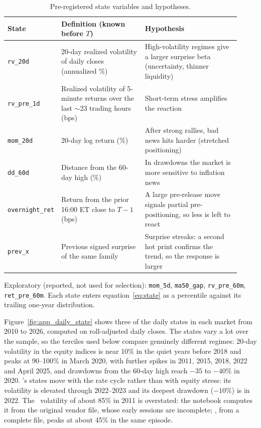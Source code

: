 \begin{table}[!htb]
  \centering\small
  \caption{Pre-registered state variables and hypotheses.}\label{tab:app_states}
  \begin{tabular}{p{0.15\linewidth}p{0.36\linewidth}p{0.41\linewidth}}
    \toprule
    State & Definition (known before $T$) & Hypothesis \\
    \midrule
    \texttt{rv\_20d} & 20-day realized volatility of daily closes (annualized \%) & High-volatility regimes give a larger surprise beta (uncertainty, thinner liquidity) \\
    \texttt{rv\_pre\_1d} & Realized volatility of 5-minute returns over the last $\sim$23 trading hours (bps) & Short-term stress amplifies the reaction \\
    \texttt{mom\_20d} & 20-day log return (\%) & After strong rallies, bad news hits harder (stretched positioning) \\
    \texttt{dd\_60d} & Distance from the 60-day high (\%) & In drawdowns the market is more sensitive to inflation news \\
    \texttt{overnight\_ret} & Return from the prior 16:00 ET close to $T-1$ (bps) & A large pre-release move signals partial pre-positioning, so less is left to react \\
    \texttt{prev\_x} & Previous signed surprise of the same family & Surprise streaks: a second hot print confirms the trend, so the response is larger \\
    \bottomrule
  \end{tabular}
  \par\smallskip\footnotesize Exploratory (reported, not used for selection): \texttt{mom\_5d},
  \texttt{ma50\_gap}, \texttt{rv\_pre\_60m}, \texttt{ret\_pre\_60m}. Each state enters
  equation~\eqref{eq:state} as a percentile against its trailing one-year distribution.
\end{table}

Figure~\ref{fig:app_daily_state} shows three of the daily states in each market from 2010 to
2026, computed on roll-adjusted daily closes. The states vary a lot over the sample, so the terciles
used below compare genuinely different regimes: 20-day volatility in the equity indices is near
10\% in the quiet years before 2018 and peaks at 90--100\% in March 2020, with further spikes in
2011, 2015, 2018, 2022 and April 2025, and drawdowns from the 60-day high reach $-35$ to $-40\%$ in
2020. \ZN's states move with the rate cycle rather than with equity stress: its volatility is
elevated through 2022--2023 and its deepest drawdown ($-10\%$) is in 2022. The \ES\ volatility of
about 85\% in 2011 is overstated: the notebook computes it from the original vendor file, whose
early sessions are incomplete; \YM, from a complete file, peaks at about 45\% in the same episode.

